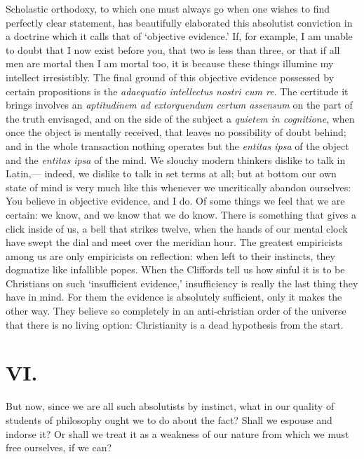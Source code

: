 \documentclass[12pt]{article}
\begin{document}
Scholastic orthodoxy, to which one must always go when one wishes to find perfectly clear statement, has beautifully elaborated this absolutist conviction in a doctrine which it calls that of `objective evidence.'  If, for example, I am unable to doubt that I now exist before you, that two is less than three, or that if all men are mortal then I am mortal too, it is because these things illumine my intellect irresistibly.  The final ground of this objective evidence possessed by certain propositions is the \emph{adaequatio intellectus nostri cum re}. The certitude it brings involves an \emph{aptitudinem ad extorquendum certum assensum} on the part of the truth envisaged, and on the side of the subject a \emph{quietem in cognitione}, when once the object is mentally received, that leaves no possibility of doubt behind; and in the whole transaction nothing operates but the \emph{entitas ipsa} of the object and the \emph{entitas ipsa} of the mind.  We slouchy modern thinkers dislike to talk in Latin,--- indeed, we dislike to talk in set terms at all; but at bottom our own state of mind is very much like this whenever we uncritically abandon ourselves: You believe in objective evidence, and I do.  Of some things we feel that we are certain: we know, and we know that we do know.  There is something that gives a click inside of us, a bell that strikes twelve, when the hands of our mental clock have swept the dial and meet over the meridian hour.  The greatest empiricists among us are only empiricists on reflection: when  left to their instincts, they dogmatize like infallible popes.  When the Cliffords tell us how sinful it is to be Christians on such `insufficient evidence,' insufficiency is really the last thing they have in mind. For them the evidence is absolutely sufficient, only it makes the other way.  They believe so completely in an anti-christian order of the universe that there is no living option: Christianity is a dead hypothesis from the start.

\section*{VI.}

But now, since we are all such absolutists by instinct, what in our quality of students of philosophy ought we to do about the fact?  Shall we espouse and indorse it?  Or shall we treat it as a weakness of our nature from which we must free ourselves, if we can?
\end{document}
